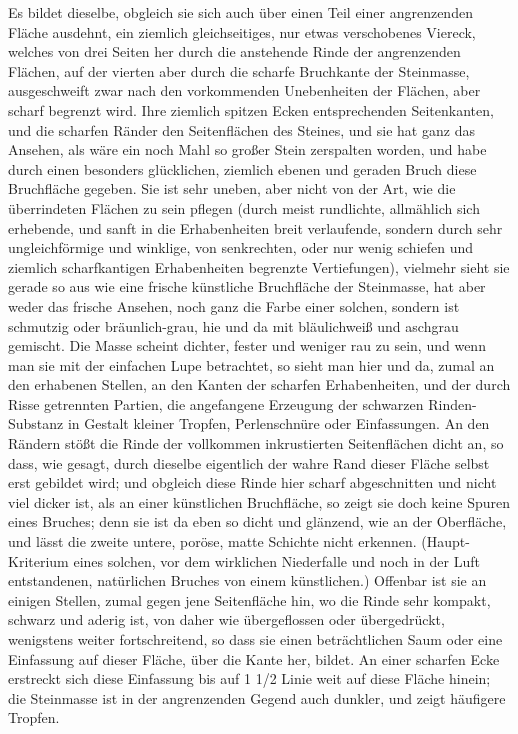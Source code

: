 \documentclass[a4paper, 11pt, oneside, german]{article}
\begin{document}
Es bildet dieselbe, obgleich sie sich auch über einen Teil einer angrenzenden Fläche ausdehnt, ein ziemlich gleichseitiges, nur etwas verschobenes Viereck, welches von drei Seiten her durch die anstehende Rinde der angrenzenden Flächen, auf der vierten aber durch die scharfe Bruchkante der Steinmasse, ausgeschweift zwar nach den vorkommenden Unebenheiten der Flächen, aber scharf begrenzt wird. Ihre ziemlich spitzen Ecken entsprechenden Seitenkanten, und die scharfen Ränder den Seitenflächen des Steines, und sie hat ganz das Ansehen, als wäre ein noch Mahl so großer Stein zerspalten worden, und habe durch einen besonders glücklichen, ziemlich ebenen und geraden Bruch diese Bruchfläche gegeben. Sie ist sehr uneben, aber nicht von der Art, wie die überrindeten Flächen zu sein pflegen (durch meist rundlichte, allmählich sich erhebende, und sanft in die Erhabenheiten breit verlaufende, sondern durch sehr ungleichförmige und winklige, von senkrechten, oder nur wenig schiefen und ziemlich scharfkantigen Erhabenheiten begrenzte Vertiefungen), vielmehr sieht sie gerade so aus wie eine frische künstliche Bruchfläche der Steinmasse, hat aber weder das frische Ansehen, noch ganz die Farbe einer solchen, sondern ist schmutzig oder bräunlich-grau, hie und da mit bläulichweiß und aschgrau gemischt. Die Masse scheint dichter, fester und weniger rau zu sein, und wenn man sie mit der einfachen Lupe betrachtet, so sieht man hier und da, zumal an den erhabenen Stellen, an den Kanten der scharfen Erhabenheiten, und der durch Risse getrennten Partien, die angefangene Erzeugung der schwarzen Rinden-Substanz in Gestalt kleiner Tropfen, Perlenschnüre oder Einfassungen. An den Rändern stößt die Rinde der vollkommen inkrustierten Seitenflächen dicht an, so dass, wie gesagt, durch dieselbe eigentlich der wahre Rand dieser Fläche selbst erst gebildet wird; und obgleich diese Rinde hier scharf abgeschnitten und nicht viel dicker ist, als an einer künstlichen Bruchfläche, so zeigt sie doch keine Spuren eines Bruches; denn sie ist da eben so dicht und glänzend, wie an der Oberfläche, und lässt die zweite untere, poröse, matte Schichte nicht erkennen. (Haupt-Kriterium eines solchen, vor dem wirklichen Niederfalle und noch in der Luft entstandenen, natürlichen Bruches von einem künstlichen.) Offenbar ist sie an einigen Stellen, zumal gegen jene Seitenfläche hin, wo die Rinde sehr kompakt, schwarz und aderig ist, von daher wie übergeflossen oder übergedrückt, wenigstens weiter fortschreitend, so dass sie einen beträchtlichen Saum oder eine Einfassung auf dieser Fläche, über die Kante her, bildet. An einer scharfen Ecke erstreckt sich diese Einfassung bis auf 1 1/2 Linie weit auf diese Fläche hinein; die Steinmasse ist in der angrenzenden Gegend auch dunkler, und zeigt häufigere Tropfen.
\end{document}
